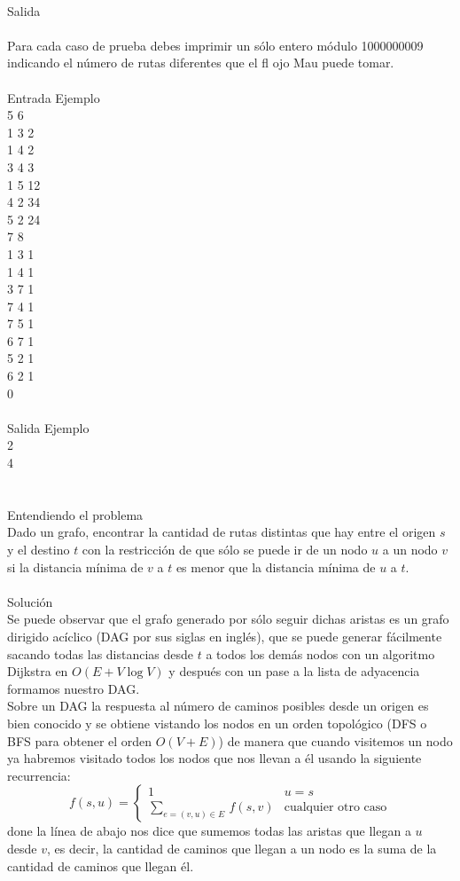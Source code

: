 \documentclass[12pt]{article}
\begin{document}
\\
\textrm{\large Salida}
\\
\\Para cada caso de prueba debes imprimir un s\'olo entero m\'odulo 1000000009 indicando el n\'umero de rutas
diferentes que el fl
ojo Mau puede tomar.\\
\\
\textrm{\large Entrada Ejemplo}
\\
5 6\\
1 3 2\\
1 4 2\\
3 4 3\\
1 5 12\\
4 2 34\\
5 2 24\\
7 8\\
1 3 1\\
1 4 1\\
3 7 1\\
7 4 1\\
7 5 1\\
6 7 1\\
5 2 1\\
6 2 1\\
0\\
\\
\textrm{\large Salida Ejemplo}
\\
2\\
4\\
\\
\\
\textrm{\large Entendiendo el problema}\\
Dado un grafo, encontrar la cantidad de rutas distintas que hay entre el origen $s$ y el destino $t$ con la restricción de que sólo se puede ir de un nodo $u$ a un nodo $v$ si la distancia mínima de $v$ a $t$ es menor que la distancia mínima de $u$ a $t$.\\
\\
\textrm{\large Solución}\\
Se puede observar que el grafo generado por sólo seguir dichas aristas 
es un grafo dirigido acíclico (DAG por sus siglas en inglés), que se puede generar fácilmente sacando todas las distancias desde $t$ a todos los demás nodos con un algoritmo Dijkstra en $O(E+V \log V)$ y después con un pase a la lista de adyacencia formamos nuestro DAG.
\\
Sobre un DAG la respuesta al número de caminos posibles desde un origen
es bien conocido y se obtiene vistando los nodos en un orden topológico (DFS o BFS para obtener el orden $O(V+E)$) de manera que cuando visitemos un nodo ya habremos visitado todos los nodos que nos llevan a él usando la siguiente recurrencia:
\[
\displaystyle f(s, u) = \begin{cases} 1 & u = s \\ \sum_{e = (v, u) \in E} \, f(s, v) & \text{cualquier otro caso} \end{cases}
\]
done la línea de abajo nos dice que sumemos todas las aristas que llegan a $u$ desde $v$, es decir, la cantidad de caminos que llegan a un nodo es la suma de la cantidad de caminos que llegan él.
\end{document}
